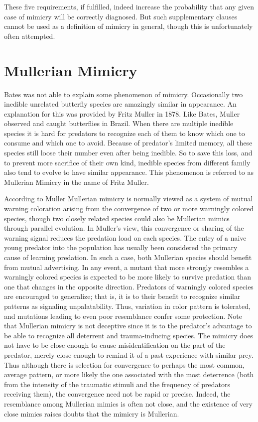 These five requirements, if fulfilled, indeed increase the probability that any given case of mimicry will be correctly diagnosed. But such supplementary clauses cannot be used as a definition of mimicry in general, though this is unfortunately often attempted. 

\section{Mullerian Mimicry}
Bates was not able to explain some phenomenon of mimicry. Occasionally two inedible unrelated butterfly species are amazingly similar in appearance. An explanation for this was provided by Fritz Muller in 1878. Like Bates, Muller observed and caught butterflies in Brazil. When there are multiple inedible species it is hard for predators to recognize each of them to know which one to consume and which one to avoid. Because of predator's limited memory, all these species still loose their number even after being inedible. So to save this loss, and to prevent more sacrifice of their own kind, inedible species from different family also tend to evolve to have similar appearance. This phenomenon is referred to as Mullerian Mimicry in the name of Fritz Muller.

According to Muller \cite{muller1879} Mullerian mimicry is normally viewed as a system of mutual warning coloration arising from the convergence of two or more warningly colored species, though two closely related species could also be Mullerian mimics through parallel evolution. In Muller's view, this convergence or sharing of the warning signal reduces the predation load on each species. The entry of a naive young predator into the population has usually been considered the primary cause of learning predation.  In such a case, both Mullerian species should benefit from mutual advertising. In any event, a mutant that more strongly resembles a warningly colored species is expected to be more likely to survive predation than one that changes in the opposite direction. Predators of warningly colored species are encouraged to generalize; that is, it is to their benefit to recognize similar patterns as signaling unpalatability. Thus, variation in color pattern is tolerated, and mutations leading to even poor resemblance confer some protection. Note that Mullerian mimicry is not deceptive since it is to the predator's advantage to be able to recognize all deterrent and trauma-inducing species. The mimicry does not have to be close enough to cause misidentification on the part of the predator, merely close enough to remind it of a past experience with similar prey.  Thus although there is selection for convergence to perhaps the most common, average pattern, or more likely the one associated with the most deterrence (both from the intensity of the traumatic stimuli and the frequency of predators receiving them), the convergence need not be rapid or precise. Indeed, the resemblance among Mullerian mimics is often not close, and the existence of very close mimics raises doubts that the mimicry is Mullerian. 

